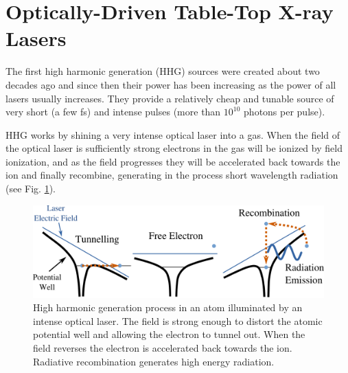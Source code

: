 \section{Optically-Driven Table-Top X-ray Lasers}

The first high harmonic generation (HHG) sources were created about two decades ago
and since then their power has been increasing as the power of all lasers usually
increases. They provide a relatively cheap and tunable source of very
short (a few fs) and intense pulses (more than $10^{10}$ photons per pulse). 

HHG works by shining a very intense optical laser into a gas. When the field of
the optical laser is sufficiently strong electrons in the gas will be ionized
by field ionization, and as the field progresses they will be accelerated back
towards the ion and finally recombine, generating in the process short
wavelength radiation (see Fig. \ref{Fig:HHG_Process}).

\begin{figure}[ht]
\centering
  \includegraphics[width=1.0 \columnwidth]{HHG_Picture1.png}
  \caption{High harmonic generation process in an atom illuminated by an intense
    optical laser. The field is strong enough to distort the atomic potential
    well and allowing the electron to tunnel out. When the field reverses the
    electron is accelerated back towards the ion. Radiative recombination generates high
    energy radiation. \cite{Corkum1993Plasma,Lewenstein1994Theory}}
  \label{Fig:HHG_Process}
\end{figure}


